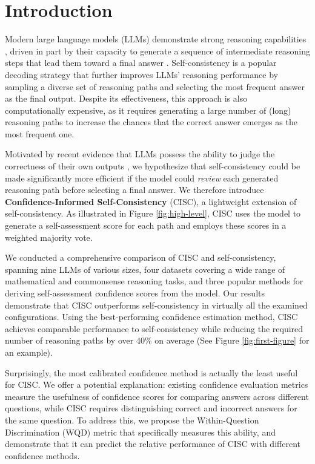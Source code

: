 \section{Introduction}
\label{sec:intro}

Modern large language models (LLMs) demonstrate strong reasoning capabilities \cite{bubeck2023sparks, guo2025deepseek}, 
driven in part by their capacity to generate a sequence of intermediate reasoning steps that lead them toward a final answer
\cite{wei2022chain, jaech2024openai}. 
Self-consistency \cite{wang2022self} is a popular decoding strategy that further improves LLMs' reasoning performance by sampling a diverse set of reasoning paths and selecting the most frequent answer as the final output. Despite its effectiveness, this approach is also computationally expensive, as it requires generating a large number of (long) reasoning paths to increase the chances that the correct answer emerges as the most frequent one.

Motivated by recent evidence that LLMs possess the ability to judge the correctness of their own outputs \cite{kadavath2022language, zhang2024small}, we hypothesize that self-consistency could be made significantly more efficient if the model could \emph{review} each generated reasoning path before selecting a final answer. We therefore introduce \textbf{Confidence-Informed Self-Consistency} (CISC), a lightweight extension of self-consistency. As illustrated in Figure \ref{fig:high-level}, CISC uses the model to generate a self-assessment score for each path and employs these scores in a weighted majority vote.

We conducted a comprehensive comparison of CISC and self-consistency, spanning nine LLMs of various sizes, four datasets covering a wide range of mathematical and commonsense reasoning tasks, and three popular methods for deriving self-assessment confidence scores from the model.
Our results demonstrate that CISC outperforms self-consistency in virtually all the examined configurations. Using the best-performing confidence estimation method, CISC achieves comparable performance to self-consistency while reducing the required number of reasoning paths by over 40\% on average (See Figure \ref{fig:first-figure} for an example).


Surprisingly, the most calibrated confidence method is actually the least useful for CISC. We offer a potential explanation:
existing confidence evaluation metrics measure the usefulness of confidence scores for comparing answers across different questions, while CISC requires distinguishing correct and incorrect answers for the same question.
To address this, we propose the Within-Question Discrimination (WQD) metric that specifically measures this ability, and demonstrate that it can predict the relative performance of CISC with different confidence methods.

